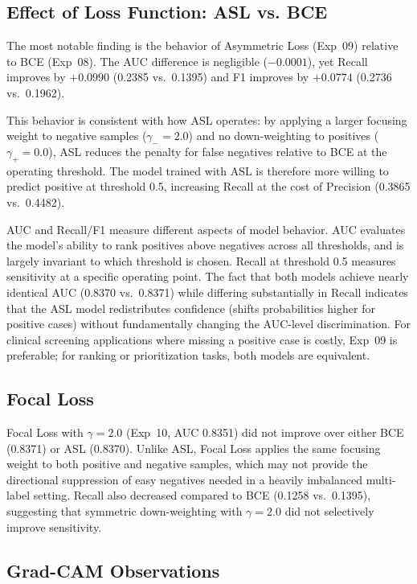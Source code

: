 \subsection{Effect of Loss Function: ASL vs. BCE}

The most notable finding is the behavior of Asymmetric Loss (Exp~09) relative to BCE (Exp~08).
The AUC difference is negligible ($-0.0001$), yet Recall improves by $+0.0990$ (0.2385 vs.\ 0.1395) and F1 improves by $+0.0774$ (0.2736 vs.\ 0.1962).

This behavior is consistent with how ASL operates: by applying a larger focusing weight to negative samples ($\gamma_- = 2.0$) and no down-weighting to positives ($\gamma_+ = 0.0$), ASL reduces the penalty for false negatives relative to BCE at the operating threshold.
The model trained with ASL is therefore more willing to predict positive at threshold 0.5, increasing Recall at the cost of Precision (0.3865 vs.\ 0.4482).

AUC and Recall/F1 measure different aspects of model behavior.
AUC evaluates the model's ability to rank positives above negatives across all thresholds, and is largely invariant to which threshold is chosen.
Recall at threshold 0.5 measures sensitivity at a specific operating point.
The fact that both models achieve nearly identical AUC (0.8370 vs.\ 0.8371) while differing substantially in Recall indicates that the ASL model redistributes confidence (shifts probabilities higher for positive cases) without fundamentally changing the AUC-level discrimination.
For clinical screening applications where missing a positive case is costly, Exp~09 is preferable; for ranking or prioritization tasks, both models are equivalent.

\subsection{Focal Loss}

Focal Loss with $\gamma{=}2.0$ (Exp~10, AUC 0.8351) did not improve over either BCE (0.8371) or ASL (0.8370).
Unlike ASL, Focal Loss applies the same focusing weight to both positive and negative samples, which may not provide the directional suppression of easy negatives needed in a heavily imbalanced multi-label setting.
Recall also decreased compared to BCE (0.1258 vs.\ 0.1395), suggesting that symmetric down-weighting with $\gamma{=}2.0$ did not selectively improve sensitivity.

\subsection{Grad-CAM Observations}

